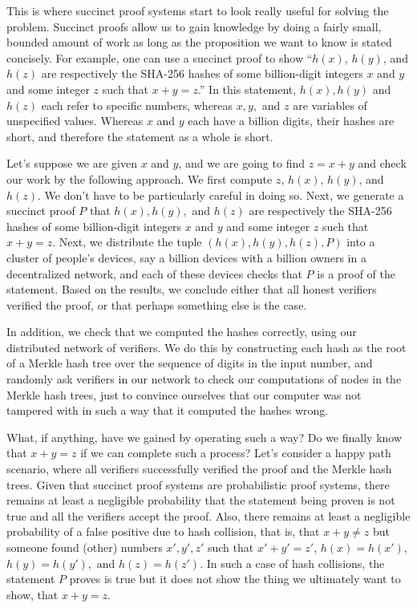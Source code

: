 \documentclass[11pt]{article}
\begin{document}
This is where succinct proof systems start to look really useful for solving the problem.
Succinct proofs allow us to gain knowledge by doing a fairly small, bounded amount of work
as long as the proposition we want to know is stated concisely.
For example, one can use a succinct proof to show ``$h(x)$, $h(y)$, and $h(z)$ are
respectively the SHA-256 hashes of some billion-digit integers $x$ and $y$ and some
integer $z$ such that $x + y = z$.'' In this statement, $h(x), h(y)$ and $h(z)$ each
refer to specific numbers, whereas $x, y,$ and $z$ are variables of unspecified values.
Whereas $x$ and $y$ each have a billion digits, their hashes are short, and therefore
the statement as a whole is short.

Let's suppose we are given $x$ and $y$, and we are going to find $z = x + y$ and check
our work by the following approach. We first compute $z$, $h(x)$, $h(y)$, and $h(z)$.
We don't have to be particularly careful in doing so. Next, we generate
a succinct proof $P$ that $h(x), h(y),$ and $h(z)$ are respectively the SHA-256
hashes of some billion-digit integers $x$ and $y$ and some integer $z$ such that
$x + y = z$. Next, we distribute the tuple $(h(x), h(y), h(z), P)$ into a cluster of
people's devices, say a billion devices with a billion owners in a decentralized
network, and each of these devices checks that $P$ is a proof of the statement.
Based on the results, we conclude either that all honest verifiers verified the proof,
or that perhaps something else is the case.

In addition, we check that we computed the hashes correctly, using our distributed 
network of verifiers. We do this by constructing each hash as the root of a Merkle
hash tree over the sequence of digits in the input number, and randomly ask verifiers
in our network to check our computations of nodes in the Merkle hash trees, just
to convince ourselves that our computer was not tampered with in such a way that it
computed the hashes wrong.

What, if anything, have we gained by operating such a way? Do we finally know that
$x + y = z$ if we can complete such a process? Let's consider a happy path scenario,
where all verifiers successfully verified the proof and the Merkle hash trees.
Given that succinct proof systems are probabilistic proof systems, there remains at
least a negligible probability that the statement being proven is not true and all
the verifiers accept the proof. Also,
there remains at least a negligible probability of a false positive due to hash collision,
that is, that $x + y \neq z$ but someone found (other) numbers $x', y', z'$ such
that $x' + y' = z'$, $h(x) = h(x')$, $h(y) = h(y'),$ and $h(z) = h(z')$. In such a
case of hash collisions, the statement $P$ proves is true but it does not show the
thing we ultimately want to show, that $x + y = z$.
\end{document}
